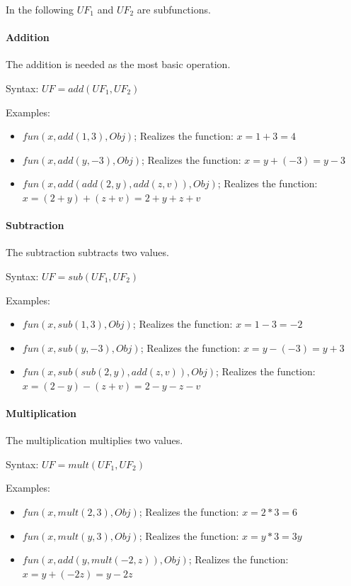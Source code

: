 In the following $UF_1$ and $UF_2$ are subfunctions.


\paragraph{Addition}

The addition is needed as the most basic operation.

\bigskip\noindent
Syntax:
$UF=add( UF_1, UF_2 )$

\bigskip\noindent
Examples:
\begin{itemize}
 \item $fun(x, add( 1, 3), Obj)$; Realizes the function: $x=1+3=4$
 \item $fun(x, add( y, -3), Obj)$; Realizes the function: $x=y+(-3)=y-3$
 \item $fun(x, add( add(2,y), add( z, v ) ), Obj)$; Realizes the function: $x=(2+y)+(z+v)=2+y+z+v$
\end{itemize}


\paragraph{Subtraction}

The subtraction subtracts two values.

\bigskip\noindent
Syntax:
$UF=sub( UF_1, UF_2 )$

\bigskip\noindent
Examples:
\begin{itemize}
 \item $fun(x, sub( 1, 3), Obj)$; Realizes the function: $x=1-3=-2$
 \item $fun(x, sub( y, -3), Obj)$; Realizes the function: $x=y-(-3)=y+3$
 \item $fun(x, sub( sub( 2, y ), add( z, v ) ), Obj)$; Realizes the function: $x=(2-y)-(z+v)=2-y-z-v$
\end{itemize}


\paragraph{Multiplication}

The multiplication multiplies two values.

\bigskip\noindent
Syntax:
$UF=mult( UF_1, UF_2 )$

\bigskip\noindent
Examples:
\begin{itemize}
 \item $fun(x, mult( 2, 3), Obj)$; Realizes the function: $x=2*3=6$
 \item $fun(x, mult( y, 3), Obj)$; Realizes the function: $x=y*3=3y$
 \item $fun(x, add( y, mult( -2, z ) ), Obj)$; Realizes the function: $x=y+(-2z)=y-2z$
\end{itemize}


